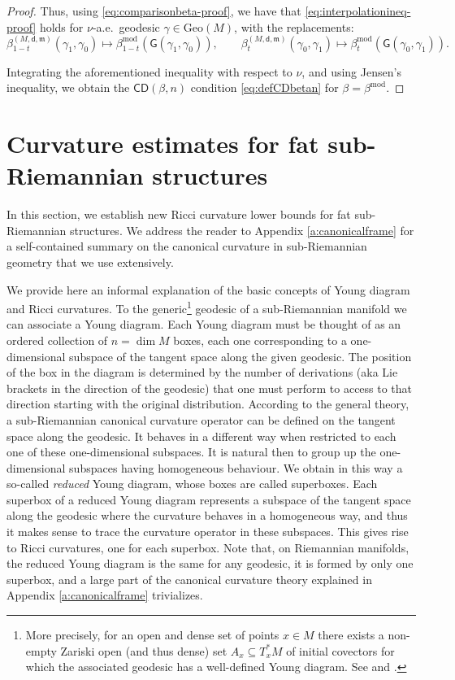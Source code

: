 \documentclass[11pt,a4paper]{article}
\theoremstyle{plain}
\theoremstyle{definition}
\theoremstyle{remark}
\numberwithin{equation}{section}
\newcommand{\CD}{\mathsf{CD}}
\newcommand{\Geo}{\mathrm{Geo}}
\newcommand{\mm}{\mathfrak m}
\newcommand{\sfd}{\mathsf d}
\newcommand{\sfG}{\mathsf G}
\begin{document}
\begin{proof}
Thus, using \eqref{eq:comparisonbeta-proof}, we have that \eqref{eq:interpolationineq-proof} holds for $\nu$-a.e.\ geodesic $\gamma \in \Geo(M)$, with the replacements:
\begin{equation}
\beta_{1-t}^{(M,\sfd,\mm)}(\gamma_1,\gamma_0)  \mapsto \beta_{1-t}^{\mathrm{mod}}(\sfG(\gamma_1,\gamma_0)),\qquad \beta_{t}^{(M,\sfd,\mm)}(\gamma_0,\gamma_1)  \mapsto \beta_{t}^{\mathrm{mod}}(\sfG(\gamma_0,\gamma_1)).
\end{equation}

Integrating the aforementioned inequality with respect to $\nu$, and using Jensen's inequality, we obtain the $\CD(\beta,n)$ condition \eqref{eq:defCDbetan} for $\beta=\beta^{\mathrm{mod}}$.
\end{proof}

\section{Curvature estimates for fat sub-Riemannian structures}\label{sec:fat}
 
In this section, we establish new Ricci curvature lower bounds for fat sub-Riemannian structures. We address  the reader to Appendix \ref{a:canonicalframe} for a self-contained summary on the canonical curvature in sub-Riemannian geometry that we use extensively.

 We provide here an informal explanation of the basic concepts of Young diagram and Ricci curvatures. To the generic\footnote{More precisely, for an open and dense set of points $x\in M$ there exists a non-empty Zariski open (and thus dense) set $A_x \subseteq T_x^*M$ of initial covectors for which the associated geodesic has a well-defined Young diagram. See \cite[Sec.\@ 5]{ZeLi} and \cite[Sec.\@ 5.2]{ABR-curvature}.} geodesic of a sub-Riemannian manifold we can associate a Young diagram. Each Young diagram must be thought of as an ordered collection of $n=\dim M$ boxes, each one corresponding to a one-dimensional subspace of the tangent space along the given geodesic. The position of the box in the diagram is determined by the number of derivations (aka Lie brackets in the direction of the geodesic) that one must perform to access to that direction starting with the original distribution. According to the general theory, a sub-Riemannian canonical curvature operator can be defined on the tangent space along the geodesic. It behaves in a different way when restricted to each one of these one-dimensional subspaces. It is natural then to group up the one-dimensional subspaces having homogeneous behaviour. We obtain in this way a so-called \emph{reduced} Young diagram, whose boxes are called superboxes. Each superbox of a reduced Young diagram represents a subspace of the tangent space along the geodesic where the curvature behaves in a homogeneous way, and thus it makes sense to trace the curvature operator in these subspaces. This gives rise to Ricci curvatures, one for each superbox. Note that, on Riemannian manifolds, the reduced Young diagram is the same for any geodesic, it is formed by only one superbox, and a large part of the canonical curvature theory explained in Appendix \ref{a:canonicalframe} trivializes. 
\end{document}

